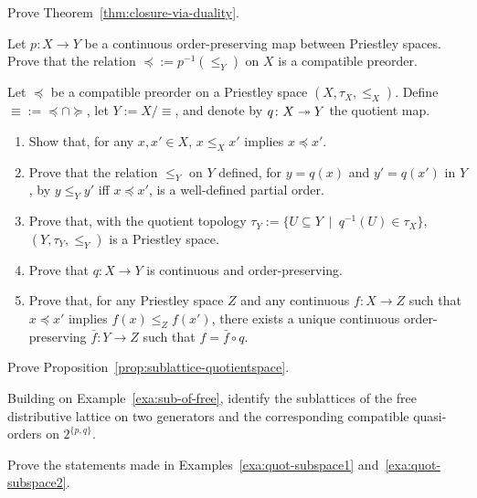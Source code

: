 \exercises



\begin{exercise}\label{exe:closure-via-duality}
Prove Theorem~\ref{thm:closure-via-duality}.
\end{exercise}

\begin{exercise}\label{exe:compatible-from-quotient}
Let $p \colon X \to Y$ be a continuous order-preserving map between Priestley spaces. Prove that the relation ${\preceq} := p^{-1}({\leq_Y})$ on $X$ is a compatible preorder.
\end{exercise}
\begin{exercise}\label{exe:compatible-to-quotient}
  Let $\preceq$ be a compatible preorder on a Priestley space ${(X,\tau_X,\leq_X)}$. Define ${\equiv} := {\preceq \cap \succeq}$, let $Y := X/{\equiv}$, and denote by $q \colon X \twoheadrightarrow Y$ the quotient map.
  \begin{enumerate}
  \item Show that, for any $x, x' \in X$, $x \leq_X x'$ implies $x \preceq x'$.
  \item Prove that the relation $\leq_Y$ on $Y$ defined, for $y = q(x)$ and $y' = q(x')$ in $Y$, by $y \leq_Y y'$ iff $x \preceq x'$, is a well-defined partial order.
  \item Prove that, with the quotient topology $\tau_Y := \{U \subseteq Y \ \mid \ q^{-1}(U) \in \tau_X\}$, $(Y,\tau_Y,\leq_Y)$ is a Priestley space.
  \item Prove that $q \colon X \to Y$ is continuous and order-preserving.
  \item Prove that, for any Priestley space $Z$ and any continuous ${f \colon X \to Z}$ such that $x \preceq x'$ implies $f(x) \leq_Z f(x')$, there exists a unique continuous order-preserving $\bar{f} \colon Y \to Z$ such that $f = \bar{f} \circ q$.
  \end{enumerate}
\end{exercise}

\begin{exercise}\label{exe:sublattice-quotient-adjunction}
Prove Proposition~\ref{prop:sublattice-quotientspace}. 
\end{exercise}

\begin{exercise}\label{exe:subs-of-freedl-two}
Building on Example~\ref{exa:sub-of-free}, identify the sublattices of the free distributive lattice on two generators and the corresponding compatible quasi-orders on $2^{\{p,q\}}$.
\end{exercise}
\begin{exercise}\label{exe:quot-subspace}
Prove the statements made in Examples~\ref{exa:quot-subspace1} and~\ref{exa:quot-subspace2}.
\end{exercise}

